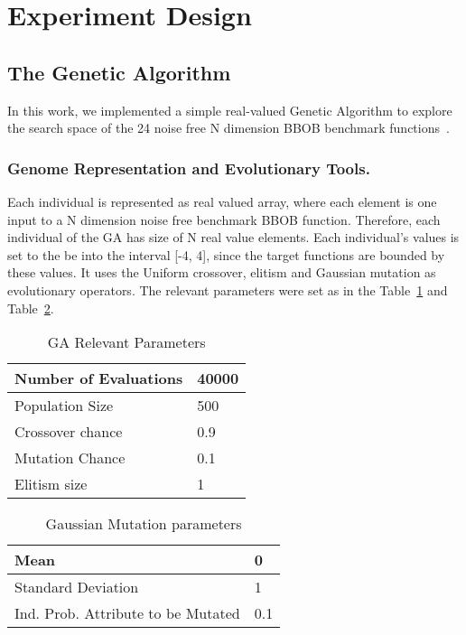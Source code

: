 \section{Experiment Design}

\subsection{The Genetic Algorithm}\label{sec:proposed:ga}

In this work, we implemented a simple real-valued Genetic Algorithm to explore the search space of the 24 noise free N dimension BBOB benchmark functions~\cite{hansen2010real}.

\subsubsection*{Genome Representation and Evolutionary Tools.}
Each individual is represented as real valued array, where each element is one input to a N dimension noise free benchmark BBOB function. Therefore, each individual of the GA has size of N real value elements. Each individual's values is set to the be into the interval [-4, 4], since the target functions are bounded by these values. It uses the Uniform crossover, elitism and Gaussian mutation as evolutionary operators. The relevant parameters were set as in the Table~\ref{relevant_par} and Table~\ref{gaussian_par}.

\begin{table}[!ht]
	\centering
	\begin{tabular}{|l|l|}
	\hline
	Number of Evaluations & 40000 \\ \hline
	Population Size &  500		\\ \hline
	Crossover chance 	& 0.9	\\ \hline
	Mutation Chance 	& 0.1	\\ \hline		
	Elitism size 		& 1		\\ \hline		
	\end{tabular}
	\caption{GA Relevant Parameters}
	\label{relevant_par}
\end{table}
	\vspace{-2mm}
%
\begin{table}[!ht]
	\centering
	\begin{tabular}{|l|l|}
	\hline
		Mean & 0 \\ \hline		
		Standard Deviation & 1 \\ \hline		
		Ind. Prob. Attribute to be Mutated &  0.1 \\ \hline		
	\end{tabular}
	\caption{Gaussian Mutation parameters}
	\label{gaussian_par}
\end{table}


